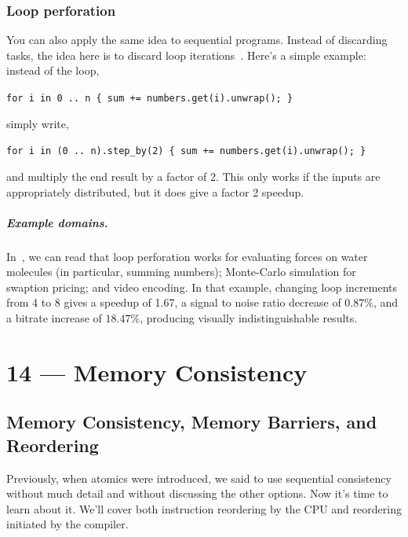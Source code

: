 \documentclass[a4paper]{report}
\begin{document}
\subsection*{Loop perforation} 
You can also apply the same idea to sequential programs. Instead
of discarding tasks, the idea here is to discard loop iterations~\cite{hoffmann09:_using_code_perfor_improv_perfor}.
Here's a simple example: instead of the loop,
\begin{center}
\verb|for i in 0 .. n { sum += numbers.get(i).unwrap(); }|
\end{center} \vspace*{-1em}
simply write,
\vspace*{-1em}\begin{center}
\verb|for i in (0 .. n).step_by(2) { sum += numbers.get(i).unwrap(); }|
\end{center}
and multiply the end result by a factor of 2. This only works 
if the inputs are appropriately distributed, but it does give a
factor 2 speedup.

\paragraph{Example domains.} In~\cite{Rinard:2010:PSA:1932682.1869525},
we can read that loop perforation works for evaluating forces on water
molecules (in particular, summing numbers); Monte-Carlo simulation for
swaption pricing; and video encoding. In that example, changing loop
increments from 4 to 8 gives a speedup of 1.67, a signal to noise ratio
decrease of $0.87\%$, and a bitrate increase of $18.47\%$, producing
visually indistinguishable results. 










\chapter*{14 --- Memory Consistency}


\section*{Memory Consistency, Memory Barriers, and Reordering}
Previously, when atomics were introduced, we said to use sequential consistency without much detail and without discussing the other options. Now it's time to learn about it. We'll cover both instruction reordering by
the CPU and reordering initiated by the compiler.  
\end{document}
